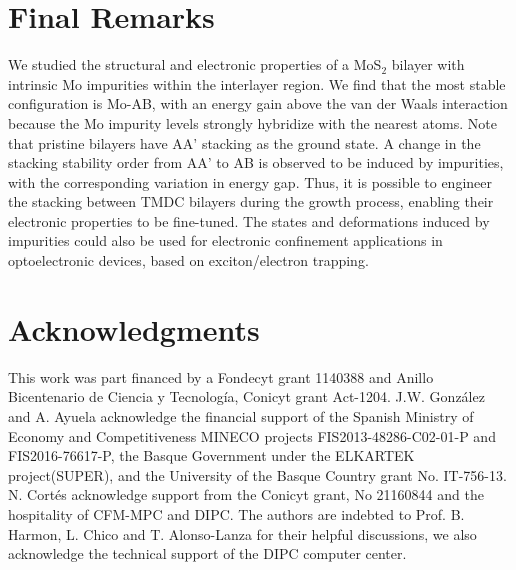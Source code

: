 \documentclass[pra,twocolumn,preprintnumbers,amsmath,amssymb]{revtex4}
\begin{document}
\section{Final Remarks}
We studied the structural and electronic properties of a MoS$_{2}$ bilayer with intrinsic Mo impurities within the interlayer region.
We find that the most stable con\-fi\-gu\-ra\-tion is Mo-AB, with an energy gain above the van der Waals interaction because the Mo impurity levels strongly hybridize with the nearest atoms.
Note that pristine bilayers have AA' stacking as the ground state.
A change in the stacking stability order from AA' to AB is observed to be induced by impurities, with the corresponding variation in energy gap. Thus, it is possible to engineer the stacking between TMDC bilayers during the growth process, enabling their electronic properties to be fine-tuned.
The states and deformations induced by impurities could also be used for electronic confinement applications in optoelectronic devices, based on exciton/electron trapping.
%




\section*{Acknowledgments}

This work was part financed by a Fondecyt grant 1140388 and Anillo Bicentenario de Ciencia y Tecnolog\'ia, Conicyt grant Act-1204. J.W. Gonz\'alez and A. Ayuela acknowledge the financial support of the  Spanish  Ministry  of  Economy  and  Competitiveness  MINECO projects  FIS2013-48286-C02-01-P  and  FIS2016-76617-P,  the  Basque  Government  under the ELKARTEK project(SUPER), and the University of the Basque Country grant No.  IT-756-13.
N. Cort\'es acknowledge support from the Conicyt grant, No 21160844 and the hospitality of CFM-MPC and DIPC.
The authors are indebted to Prof. B. Harmon, L. Chico and T. Alonso-Lanza for their helpful discussions, we also acknowledge the technical support of the DIPC computer center.


\end{document}
